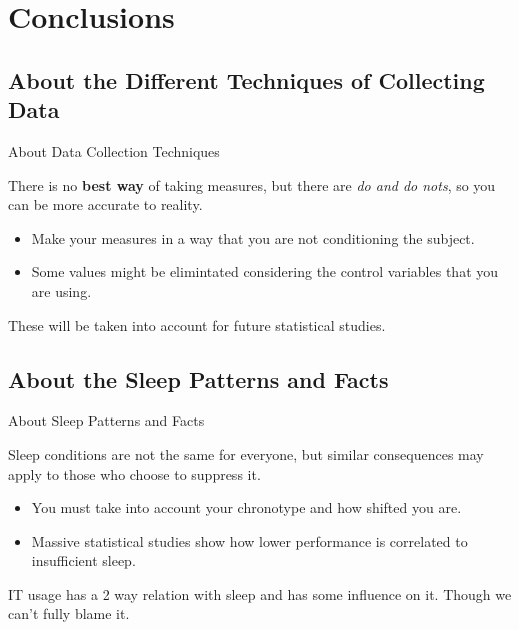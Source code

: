 \documentclass{beamer}
\begin{document}
\section{Conclusions}

\subsection{About the Different Techniques of Collecting Data}

\begin{frame}{About Data Collection Techniques}

There is no \textbf{best way} of taking measures, but there are \textit{do and do nots}, so you can be more accurate to reality.

\begin{itemize}
    \item Make your measures in a way that you are not conditioning the subject.
    \item Some values might be elimintated considering the control variables that you are using.
\end{itemize}

\medskip

These will be taken into account for future statistical studies.
    
\end{frame}

\subsection{About the Sleep Patterns and Facts}

\begin{frame}{About Sleep Patterns and Facts}

Sleep conditions are not the same for everyone, but similar consequences may apply to those who choose to suppress it.

\begin{itemize}
    \item You must take into account your chronotype and how shifted you are.
    \item Massive statistical studies show how lower performance is correlated to insufficient sleep.
\end{itemize}

\medskip
    
IT usage has a 2 way relation with sleep and has some influence on it. Though we can't fully blame it.    
    
\end{frame}
\end{document}
